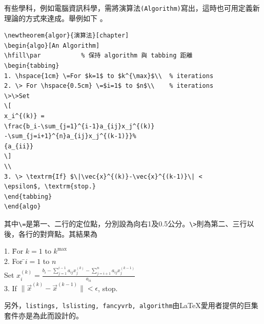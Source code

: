 有些學科，例如電腦資訊科學，需將演算法{\tt(Algorithm)}寫出，這時也可用定義新理論的方式來達成。舉例如下
。
\begin{Verbatim}[frame=single,firstline=1,label={An algorithm}]
\newtheorem{algor}{演算法}[chapter]
\begin{algo}[An Algorithm]
\hfill\par           % 保持 algorithm 與 tabbing 距離
\begin{tabbing}
1. \hspace{1cm} \=For $k=1$ to $k^{\max}$\\  % iterations
2. \> For \hspace{0.5cm} \=$i=1$ to $n$\\    % iterations
\>\>Set
\[
x_i^{(k)} =
\frac{b_i-\sum_{j=1}^{i-1}a_{ij}x_j^{(k)}
-\sum_{j=i+1}^{n}a_{ij}x_j^{(k-1)}}%
{a_{ii}}
\]
\\
3. \> \textrm{If} $\|\vec{x}^{(k)}-\vec{x}^{(k-1)}\| < 
\epsilon$, \textrm{stop.}
\end{tabbing}
\end{algo}
\end{Verbatim}
其中\verb+\=+是第一、二行的定位點，分別設為向右1及0.5公分。\verb+\>+則為第二、三行以後，各行的對齊點。其結果為 
\begin{algo}[An Algorithm]
\hfill\par   %
\begin{tabbing}
1. \hspace{1cm} \=For $k=1$ to $k^{\max}$ \\   
2. \> For \hspace{0.5cm}\=$i=1$ to $n$\\   
\>\> Set
$
x_i^{(k)} =
\frac{b_i-\sum_{j=1}^{i-1}a_{ij}x_j^{(k)}
-\sum_{j=i+1}^{n}a_{ij}x_j^{(k-1)}} {a_{ii}}
$\\
3. \>\textrm{If} $\|\vec{x}^{(k)}-\vec{x}^{(k-1)}\| < \epsilon$, \textrm{stop.}
\end{tabbing}
\end{algo}
另外，{\tt listings, lslisting, fancyvrb, algorithm}由\LaTeX{}愛用者提供的巨集套件亦是為此而設計的。
